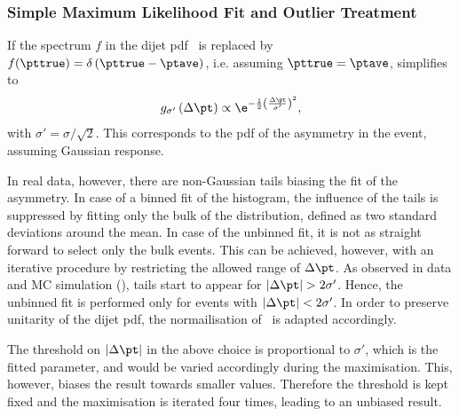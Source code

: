\subsubsection{Simple Maximum Likelihood Fit and Outlier Treatment}\label{sec:ResFit:Asym:SimpleFit}

If the spectrum $f$ in the dijet pdf~ is replaced by \mbox{$f(\pttrue)  = \delta\left(\pttrue - \ptave\right)$}, i.e. assuming \mbox{$\pttrue = \ptave$}, 
 simplifies to
\begin{equation}
\label{eq:ResFit::DijetPdfTransformed:Simple}
  g_{\sigma'}\left(\Delta\pt\right) \propto
  \e^{-\frac{1}{2}\left(\frac{\Delta\pt}{\sigma'}\right)^{2}}, 
\end{equation}
with \mbox{$\sigma' = \sigma/\sqrt{2}$}.
This corresponds to the pdf of the asymmetry in the event, assuming
Gaussian response.

In real data, however, there are non-Gaussian tails biasing the fit of the asymmetry.
In case of a binned fit of the histogram, the influence of the tails is suppressed by
fitting only the bulk of the distribution, defined as two standard deviations around the mean.
In case of the unbinned fit, it is not as straight
forward to select only the bulk events.
This can be achieved, however, with an iterative procedure by restricting
the allowed range of $\Delta\pt$.
As observed in data and MC simulation (), tails start to appear for \mbox{$|\Delta\pt| > 2\sigma'$}.
Hence, the unbinned fit is performed only for events with \mbox{$|\Delta\pt| < 2\sigma'$}.
In order to preserve unitarity of the dijet pdf, the normailisation
of~ is adapted accordingly.

The threshold on $|\Delta\pt|$ in the above choice is proportional to $\sigma'$, which is the fitted parameter, and would be varied accordingly during the maximisation.
This, however, biases the result towards smaller  values.
Therefore the threshold is kept fixed and the maximisation is iterated
four times, leading to an unbiased result.

